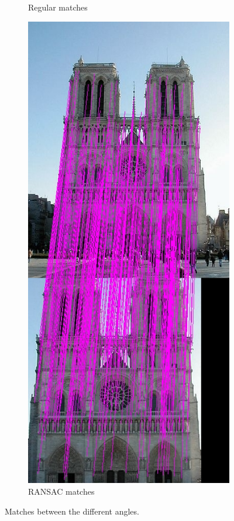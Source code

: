 \documentclass[10pt,a4paper]{article}
\begin{document}
\begin{figure}
\begin{subfigure}[b]{0.3\textwidth}
	\caption{Regular matches}
	\end{subfigure}
	\begin{subfigure}[b]{0.3\textwidth}
	\includegraphics[width=\textwidth]{sift/matches.ransac.jpg}
	\caption{RANSAC matches}
	\end{subfigure}
	\caption{Matches between the different angles.}
	\label{fig:matches}
\end{figure}
\end{document}
